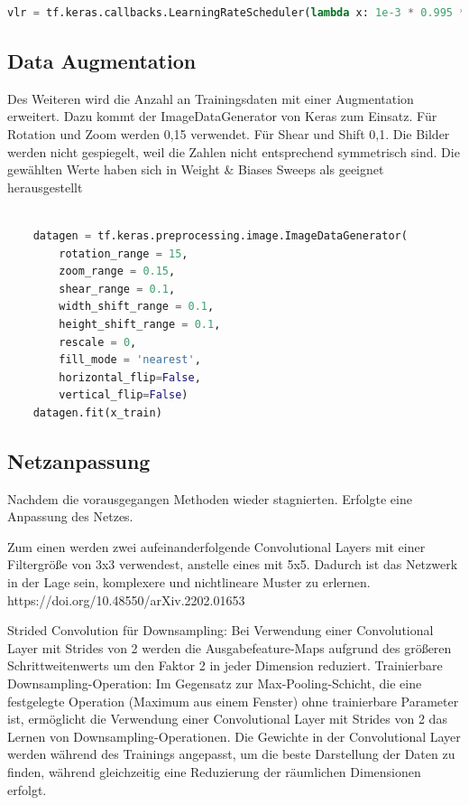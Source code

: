 \documentclass[
fontsize=12pt,					%
paper=a4,						%
twoside=true, 					%
listof=totoc, 					%
bibliography=totoc,				%
titlepage, 						%
headsepline, 					%
DIV=12,							%
BCOR=6mm,						%
cleardoublepage=empty,			%
parskip,							%
ngerman
]{scrartcl}
\begin{document}
\begin{lstlisting}[language=Python, caption=Variable Learning-Rate, label=vlr]
	vlr = tf.keras.callbacks.LearningRateScheduler(lambda x: 1e-3 * 0.995 ** x)
\end{lstlisting}

\subsection{Data Augmentation}

Des Weiteren wird die Anzahl an Trainingsdaten mit einer Augmentation erweitert. Dazu kommt der ImageDataGenerator von Keras zum Einsatz. Für Rotation und Zoom werden 0,15 verwendet. Für Shear und Shift 0,1. Die Bilder werden nicht gespiegelt, weil die Zahlen nicht entsprechend symmetrisch sind. Die gewählten Werte haben sich in Weight \& Biases Sweeps als geeignet herausgestellt

\begin{lstlisting}[language=Python, caption=Data Augmentation, label=da]
	
	datagen = tf.keras.preprocessing.image.ImageDataGenerator(
		rotation_range = 15,
		zoom_range = 0.15,
		shear_range = 0.1,
		width_shift_range = 0.1,
		height_shift_range = 0.1,
		rescale = 0,
		fill_mode = 'nearest',
		horizontal_flip=False,
		vertical_flip=False)
	datagen.fit(x_train)

\end{lstlisting}

\subsection{Netzanpassung}

Nachdem die vorausgegangen Methoden wieder stagnierten. Erfolgte eine Anpassung des Netzes.

Zum einen werden zwei aufeinanderfolgende Convolutional Layers mit einer Filtergröße von 3x3 verwendest, anstelle eines mit 5x5. Dadurch ist das Netzwerk in der Lage sein, komplexere und nichtlineare Muster zu erlernen. https://doi.org/10.48550/arXiv.2202.01653 


Strided Convolution für Downsampling: Bei Verwendung einer Convolutional Layer mit Strides von 2 werden die Ausgabefeature-Maps aufgrund des größeren Schrittweitenwerts um den Faktor 2 in jeder Dimension reduziert.
Trainierbare Downsampling-Operation: Im Gegensatz zur Max-Pooling-Schicht, die eine festgelegte Operation (Maximum aus einem Fenster) ohne trainierbare Parameter ist, ermöglicht die Verwendung einer Convolutional Layer mit Strides von 2 das Lernen von Downsampling-Operationen. Die Gewichte in der Convolutional Layer werden während des Trainings angepasst, um die beste Darstellung der Daten zu finden, während gleichzeitig eine Reduzierung der räumlichen Dimensionen erfolgt.
\end{document}
